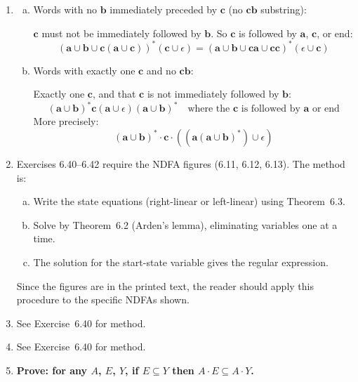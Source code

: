 \begin{enumerate}[{6.}1.]
\begin{enumerate}[(a)]
  Answer: $\pmb{b}^*\pmb{a}^*\cdot\pmb{c}\cdot\pmb{b}^*\pmb{a}^*\cdot\pmb{c}\cdot\pmb{b}^*\pmb{a}^*$.
\end{enumerate}

\item \begin{enumerate}[(a)]
  \item Words with no $\pmb{b}$ immediately preceded by $\pmb{c}$ (no $\pmb{cb}$ substring):

  $\pmb{c}$ must not be immediately followed by $\pmb{b}$.  So $\pmb{c}$ is followed by $\pmb{a}$, $\pmb{c}$, or end:
  \[
    (\pmb{a}\cup\pmb{b}\cup\pmb{c}(\pmb{a}\cup\pmb{c}))^*(\pmb{c}\cup\epsilon) = (\pmb{a}\cup\pmb{b}\cup\pmb{ca}\cup\pmb{cc})^*(\epsilon\cup\pmb{c})
  \]

  \item Words with exactly one $\pmb{c}$ and no $\pmb{cb}$:

  Exactly one $\pmb{c}$, and that $\pmb{c}$ is not immediately followed by $\pmb{b}$:
  \[
    (\pmb{a}\cup\pmb{b})^*\pmb{c}(\pmb{a}\cup\epsilon)(\pmb{a}\cup\pmb{b})^*
    \quad\text{where the $\pmb{c}$ is followed by $\pmb{a}$ or end}
  \]
  More precisely:
  \[
    (\pmb{a}\cup\pmb{b})^*\cdot\pmb{c}\cdot((\pmb{a}(\pmb{a}\cup\pmb{b})^*)\cup\epsilon)
  \]
\end{enumerate}

\item Exercises 6.40--6.42 require the NDFA figures (6.11, 6.12, 6.13).  The method is:
\begin{enumerate}[(a)]
  \item Write the state equations (right-linear or left-linear) using Theorem~6.3.
  \item Solve by Theorem~6.2 (Arden's lemma), eliminating variables one at a time.
  \item The solution for the start-state variable gives the regular expression.
\end{enumerate}
Since the figures are in the printed text, the reader should apply this procedure to the specific NDFAs shown.

\item See Exercise~6.40 for method.

\item See Exercise~6.40 for method.

\item \textbf{Prove: for any $A$, $E$, $Y$, if $E\subseteq Y$ then $A\cdot E\subseteq A\cdot Y$.}


\end{enumerate}
